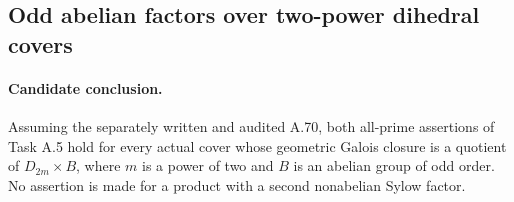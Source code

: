 \subsection{Odd abelian factors over two-power dihedral covers}

\paragraph{Candidate conclusion.}
Assuming the separately written and audited A.70, both all-prime
assertions of Task A.5 hold for every actual cover whose geometric
Galois closure is a quotient of
\(D_{2m}\times B\), where \(m\) is a power of two and \(B\)
is an abelian group of odd order. No assertion is made for a
product with a second nonabelian Sylow factor.

